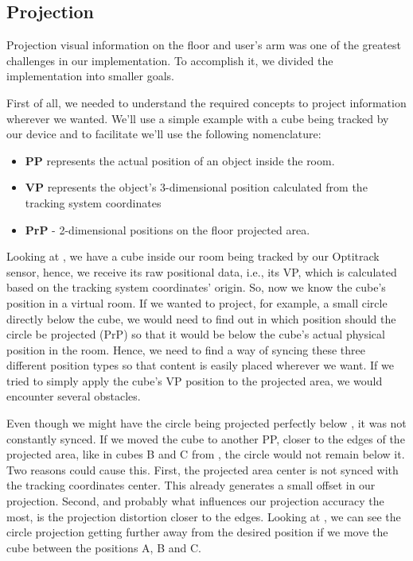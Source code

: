 \subsection{Projection}
\label{prototype-projection}


Projection visual information on the floor and user's arm was one of the greatest challenges in our implementation. To accomplish it, we divided the implementation into smaller goals.

First of all, we needed to understand the required concepts to project information wherever we wanted. We'll use a simple example with a cube being tracked by 
our device and to facilitate we'll use the following nomenclature:

\begin{itemize}
\item \textbf{\ac{PP}} represents the actual position of an object inside the room.
\item \textbf{\ac{VP}} represents the object's 3-dimensional position calculated from the tracking system coordinates
\item \textbf{\ac{PrP}} - 2-dimensional positions on the floor projected area.
\end{itemize}



Looking at , we have a cube inside our room being tracked by our Optitrack sensor, hence, we receive its raw positional data, i.e., its \ac{VP}, which is calculated based on the tracking system coordinates' origin.
So, now we know the cube's position in a virtual room. If we wanted to project, for example, a small circle directly below the cube, we would need to find out in which position should the circle be projected (\ac{PrP}) so that it would be below the cube's actual physical position in the room. Hence, we need to find a way of syncing these three different position types so that content is easily placed wherever we want. If we tried to simply apply the cube's \ac{VP} position to the projected area, we would encounter several obstacles.



Even though we might have the circle being projected perfectly below , it was not constantly synced.
If we moved the cube to another \ac{PP}, closer to the edges of the projected area, like in cubes B and C from , the circle would not remain below it. 
Two reasons could cause this. First, the projected area center is not synced with the tracking coordinates center. 
This already generates a small offset in our projection. 
Second, and probably what influences our projection accuracy the most, is the projection distortion closer to the edges.
Looking at , we can see the circle projection getting further away from the desired position if we move the cube between the positions A, B and C.


